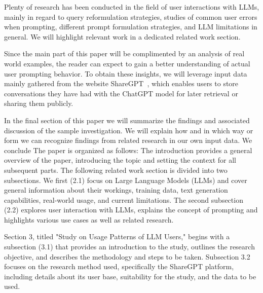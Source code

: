 Plenty of research has been conducted in the field of user interactions with LLMs, mainly in
regard to query reformulation strategies, studies of common user errors when prompting,
different prompt formulation strategies, and LLM limitations in general.
We will highlight relevant work in a dedicated related work section. %

Since the main part of this paper will be complimented by an analysis of real world examples, the
reader can expect to gain a better understanding of actual user prompting behavior.
To obtain these insights, we will leverage input data mainly gathered from the website
ShareGPT~\cite{sharegpt_sharegpt_2023}, %
which enables users to store conversations they have had with the ChatGPT model for later retrieval
or sharing them publicly.

In the final section of this paper we will summarize the findings and associated discussion
of the sample investigation.
We will explain how and in which way or form we can recognize findings from related research in
our own input data.
We conclude
The paper is organized as follows: The introduction %
provides a general overview of the paper, introducing the topic and setting the context for all
subsequent parts.
The following related work section %
is divided into two subsections.
We first (2.1) focus on Large Language Models (LLMs) and cover general information about their
workings, training data, text generation capabilities, real-world usage, and current limitations.
The second subsection (2.2) explores user interaction with LLMs, explains the concept of
prompting and highlights various use cases as well as related research.

Section 3, titled "Study on Usage Patterns of LLM Users," begins with a subsection (3.1) that provides an introduction to the study, outlines the research objective, and describes the methodology and steps to be taken. Subsection 3.2 focuses on the research method used, specifically the ShareGPT platform, including details about its user base, suitability for the study, and the data to be used.

